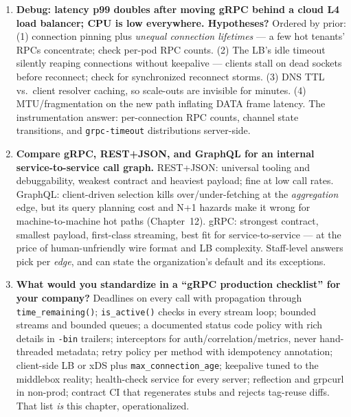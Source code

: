 \begin{enumerate}[label=\textbf{Q\arabic*.}, leftmargin=1.5cm]
        change is genuinely breaking, version the \emph{package}
        (\texttt{northwind.telemetry.v2}) so both generations coexist on the
        wire, run dual servers during migration, and retire v1 with measured
        deprecation. Package-level versions in the \texttt{:path} make routing,
        metrics, and sunset enforcement trivial --- this is why the version
        belongs in the package name from day one.
  \item \textbf{Debug: latency p99 doubles after moving gRPC behind a cloud
        L4 load balancer; CPU is low everywhere. Hypotheses?}
        Ordered by prior: (1) connection pinning plus \emph{unequal
        connection lifetimes} --- a few hot tenants' RPCs concentrate; check
        per-pod RPC counts. (2) The LB's idle timeout silently reaping
        connections without keepalive --- clients stall on dead sockets before
        reconnect; check for synchronized reconnect storms. (3) DNS TTL vs.\
        client resolver caching, so scale-outs are invisible for minutes. (4)
        MTU/fragmentation on the new path inflating DATA frame latency. The
        instrumentation answer: per-connection RPC counts, channel state
        transitions, and \texttt{grpc-timeout} distributions server-side.
  \item \textbf{Compare gRPC, REST+JSON, and GraphQL for an internal
        service-to-service call graph.}
        REST+JSON: universal tooling and debuggability, weakest contract and
        heaviest payload; fine at low call rates. GraphQL: client-driven
        selection kills over/under-fetching at the \emph{aggregation} edge, but
        its query planning cost and N+1 hazards make it wrong for
        machine-to-machine hot paths (Chapter~12). gRPC: strongest contract,
        smallest payload, first-class streaming, best fit for
        service-to-service --- at the price of human-unfriendly wire format and
        LB complexity. Staff-level answers pick per \emph{edge}, and can state
        the organization's default and its exceptions.
  \item \textbf{What would you standardize in a ``gRPC production checklist''
        for your company?}
        Deadlines on every call with propagation through
        \texttt{time\_remaining()}; \texttt{is\_active()} checks in every
        stream loop; bounded streams and bounded queues; a documented status
        code policy with rich details in \texttt{-bin} trailers; interceptors
        for auth/correlation/metrics, never hand-threaded metadata; retry
        policy per method with idempotency annotation; client-side LB or xDS
        plus \texttt{max\_connection\_age}; keepalive tuned to the middlebox
        reality; health-check service for every server; reflection and grpcurl
        in non-prod; contract CI that regenerates stubs and rejects
        tag-reuse diffs. That list \emph{is} this chapter, operationalized.
\end{enumerate}

